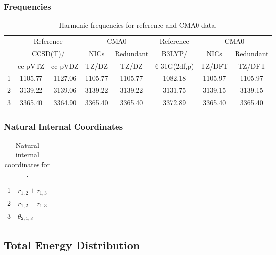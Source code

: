 \documentclass[10pt,oneside]{article}
\begin{document}
\begin{table}[h!]
\subsubsection*{Frequencies}
\centering
\caption{Harmonic frequencies for reference and CMA0 data.}
\begin{tabular}{cccccccc}
\toprule
{} & \multicolumn{2}{c}{Reference} & \multicolumn{2}{c}{CMA0} &    Reference & \multicolumn{2}{c}{CMA0} \\
{} & \multicolumn{2}{c}{CCSD(T)/} &    NICs &  Redundant &       B3LYP/ &    NICs & Redundant \\
{} &   cc-pVTZ & cc-pVDZ &   TZ/DZ &      TZ/DZ & 6-31G(2df,p) &  TZ/DFT &    TZ/DFT \\
\midrule
1 &   1105.77 & 1127.06 & 1105.77 &    1105.77 &      1082.18 & 1105.97 &   1105.97 \\
2 &   3139.22 & 3139.06 & 3139.22 &    3139.22 &      3131.75 & 3139.15 &   3139.15 \\
3 &   3365.40 & 3364.90 & 3365.40 &    3365.40 &      3372.89 & 3365.40 &   3365.40 \\
\bottomrule
\end{tabular}
\end{table}

\begin{table}[h!]
\subsubsection*{Natural Internal Coordinates}
\centering
\caption{Natural internal coordinates for .}
\small
\begin{tabular}{ll}
\toprule
  1   & $r_{1,2} + r_{1,3}$ \\
  2   & $r_{1,2} - r_{1,3}$ \\
  3   & $\theta_{2,1,3}$ \\
\bottomrule
\end{tabular}
\end{table}

\begin{table}
\subsection*{Total Energy Distribution}
\centering\end{table}

\clearpage

\subsection{}
\end{document}
